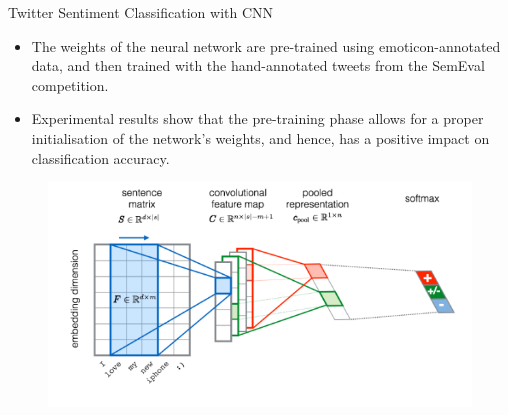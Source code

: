 \documentclass[handout]{beamer}
\begin{document}
\begin{frame}{Twitter Sentiment Classification with CNN}
\begin{scriptsize}
\begin{itemize}
\item  The weights of the neural network are pre-trained using emoticon-annotated data, and then trained with the hand-annotated tweets from the SemEval competition.
\item   Experimental results show that the pre-training phase allows for a proper initialisation of the network's weights, and hence, has a positive impact on classification accuracy. 
\end{itemize}
  \begin{figure}[h]
        	\includegraphics[scale = 0.45]{pics/cnn-twitter.png}
        \end{figure}
\end{scriptsize}
\end{frame}
\end{document}
